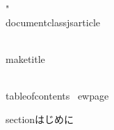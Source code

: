 "\\documentclass{jsarticle}
\begin{document}
\\maketitle

\\tableofcontents
\
ewpage

section{はじめに}

\
\end{document}
